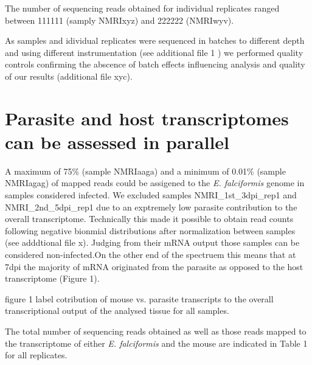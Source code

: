 \documentclass{bmcart}
\begin{document}
The number of sequencing reads obtained for individual replicates
ranged between 111111 (samply NMRIxyz) and 222222 (NMRIwyv).

As samples and idividual replicates were sequenced in batches to
different depth and using different instrumentation (see additional
file 1 %
) we performed quality controls confirming the abscence of batch
effects influencing analysis and quality of our results (additional
file xyc).

\section*{Parasite and host transcriptomes can be assessed in parallel}

A maximum of 75\% (sample NMRIaaga) and a minimum of 0.01\% (sample
NMRIagag) of mapped reads could be assigened to the
\textit{E. falciformis} genome in samples considered infected. We
excluded samples NMRI\_1st\_3dpi\_rep1 and NMRI\_2nd\_5dpi\_rep1 due
to an exptremely low parasite contribution to the overall
transcriptome. Technically this made it possible to obtain read counts
following negative bionmial distributions after normalization between
samples (see adddtional file x). Judging from their mRNA output those
samples can be considered non-infected.On the other end of the
spectruem this means that at 7dpi the majority of mRNA originated from
the parasite as opposed to the host transcriptome (Figure 1).

figure 1 label
cotribution of mouse vs. parasite transcripts to the overall
transcriptional output of the analysed tissue for all samples.

The total number of sequencing reads obtained as well as those reads
mapped to the transcriptome of either \textit{E. falciformis} and the
mouse are indicated in Table 1 for all replicates.





\end{document}
